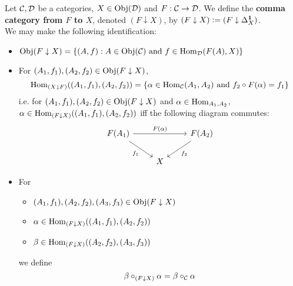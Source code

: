 \documentclass{book}
\begin{document}
	\begin{defn}
		Let $\mathcal{C}, \mathcal{D}$ be a categories, $X \in \operatorname{Obj}(\mathcal{D})$ and $F: \mathcal{C} \rightarrow \mathcal{D}$. We define the \textbf{comma category from $F$ to $X$}, denoted $(F \downarrow X)$, by $(F \downarrow X) \vcentcolon= (F \downarrow \Delta^{\operatorname*{\mathbf{1}}}_X)$.\\
		We may make the following identification:
		\begin{itemize}
			\item $\operatorname{Obj}(F \downarrow X) = \{(A, f): A \in \operatorname{Obj}(\mathcal{C}) \text{ and } f \in \operatorname{Hom}_{\mathcal{D}}(F(A), X)\}$ 
			\item For $(A_1, f_1), (A_2, f_2) \in \operatorname{Obj}(F \downarrow X)$, 
			$$\operatorname{Hom}_{(X \downarrow F)}((A_1, f_1), (A_2, f_2)) = \{\alpha \in \operatorname{Hom}_{\mathcal{C}}(A_1, A_2) \text{ and } f_2 \circ F(\alpha)  = f_1\}$$
			i.e. for $(A_1, f_1), (A_2, f_2) \in \operatorname{Obj}(F \downarrow X)$ and $\alpha \in \operatorname{Hom}_{A_1, A_2}$, $\alpha \in \operatorname{Hom}_{(F \downarrow X)}((A_1, f_1), (A_2, f_2))$ iff the following diagram commutes:
			\[ 
			\begin{tikzcd}
				F(A_1) \arrow[dr, "f_1"'] \arrow[rr, "F(\al)"] &&  F(A_2) \arrow[dl, "f_2"]\\
				& X  & 
			\end{tikzcd}
			\]
			\item For 
			\begin{itemize}
				\item $(A_1, f_1), (A_2, f_2), (A_3, f_3) \in \operatorname{Obj}(F \downarrow X)$
				\item $\alpha \in \operatorname{Hom}_{(F \downarrow X)}((A_1, f_1), (A_2, f_2))$
				\item $\beta \in \operatorname{Hom}_{(F \downarrow X)}((A_2, f_2), (A_3, f_3))$
			\end{itemize}
			we define 
			$$\beta \circ_{(F \downarrow X)} \alpha = \beta \circ_{\mathcal{C}} \alpha $$
		\end{itemize}
	\end{defn}
	
	
	
	
	
	
	
	
	
	
	
	
	
	
	
	
	
	
	
	
	
	
	
	
	
	
	
	
	
	
	
\end{document}
